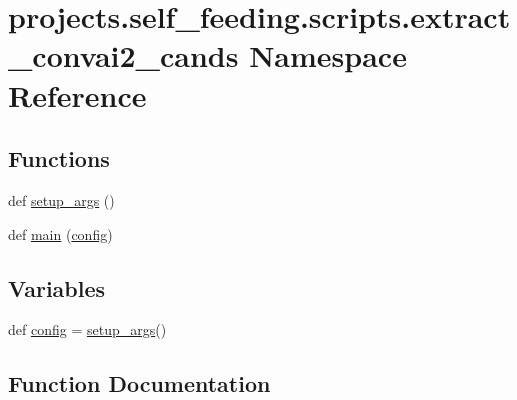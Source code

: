 \hypertarget{namespaceprojects_1_1self__feeding_1_1scripts_1_1extract__convai2__cands}{}\section{projects.\+self\+\_\+feeding.\+scripts.\+extract\+\_\+convai2\+\_\+cands Namespace Reference}
\label{namespaceprojects_1_1self__feeding_1_1scripts_1_1extract__convai2__cands}
\subsection*{Functions}
\begin{DoxyCompactItemize}
\item 
def \hyperlink{namespaceprojects_1_1self__feeding_1_1scripts_1_1extract__convai2__cands_a195803e64ff287a8e844a00e6a24ceef}{setup\+\_\+args} ()
\item 
def \hyperlink{namespaceprojects_1_1self__feeding_1_1scripts_1_1extract__convai2__cands_a6b1b88203a7adfdd0cf791d83425209b}{main} (\hyperlink{namespaceprojects_1_1self__feeding_1_1scripts_1_1extract__convai2__cands_a77df404316f00c7bd483428856a73598}{config})
\end{DoxyCompactItemize}
\subsection*{Variables}
\begin{DoxyCompactItemize}
\item 
def \hyperlink{namespaceprojects_1_1self__feeding_1_1scripts_1_1extract__convai2__cands_a77df404316f00c7bd483428856a73598}{config} = \hyperlink{namespaceprojects_1_1self__feeding_1_1scripts_1_1extract__convai2__cands_a195803e64ff287a8e844a00e6a24ceef}{setup\+\_\+args}()
\end{DoxyCompactItemize}


\subsection{Function Documentation}
\mbox{\label{namespaceprojects_1_1self__feeding_1_1scripts_1_1extract__convai2__cands_a6b1b88203a7adfdd0cf791d83425209b}} 

